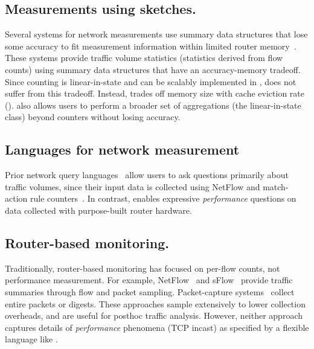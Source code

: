 \subsection{Measurements using sketches.} Several systems for network
measurements use summary data structures that lose some accuracy to fit
measurement information within limited router memory~\cite{univmon, flowradar,
counterbraids, dream, progme, opensketch}. These systems provide traffic volume
statistics (\ie statistics derived from flow counts) using summary data
structures that have an accuracy-memory tradeoff. Since counting is
linear-in-state and can be scalably implemented in \TheSystem, \TheSystem does
not suffer from this tradeoff. Instead, \TheSystem trades off memory size with
cache eviction rate ().  \TheSystem also allows users to perform a
broader set of aggregations (the linear-in-state class) beyond counters without
losing accuracy.

\subsection{Languages for network measurement} Prior network query
languages~\cite{gigascope, frenetic, path_query, streaming-monitoring} allow
users to ask questions primarily about traffic volumes, since their input data
is collected using NetFlow and match-action rule counters~\cite{openflow}. In
contrast, \TheSystem enables expressive {\em performance} questions on data
collected with purpose-built router hardware.

\subsection{Router-based monitoring.} Traditionally, router-based monitoring has
focused on per-flow counts, not performance measurement. For example,
NetFlow~\cite{netflow} and sFlow~\cite{sflow} provide traffic summaries
through flow and packet sampling. Packet-capture systems~\cite{cisco-span,
niksun, netsight, everflow, pathdump, path_query} collect entire packets or
digests. These approaches sample extensively to lower collection
overheads, and are useful for posthoc traffic analysis. However, neither
approach captures details of {\em performance} phenomena (\eg TCP incast) as
specified by a flexible language like \TheSystem.

